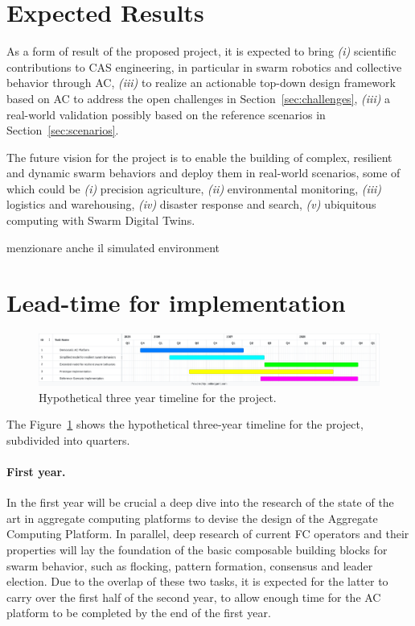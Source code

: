 \documentclass[12pt]{article}
\begin{document}
\section{Expected Results}
As a form of result of the proposed project, it is expected to bring \textit{(i)} scientific contributions to CAS engineering, in particular in swarm robotics and collective behavior through AC,
\textit{(iii)} to realize an actionable top-down design framework based on AC to address the open challenges in Section~\ref{sec:challenges}, \textit{(iii)} a real-world validation possibly based on the reference scenarios in Section~\ref{sec:scenarios}.

The future vision for the project is to enable the building of complex, resilient and dynamic swarm behaviors and deploy them in real-world scenarios, some of which could be \textit{(i)} precision agriculture,
\textit{(ii)} environmental monitoring, \textit{(iii)} logistics and warehousing, \textit{(iv)} disaster response and search, 
\textit{(v)} ubiquitous computing with Swarm Digital Twins.

menzionare anche il simulated environment
\section{Lead-time for implementation}
\begin{figure}
	\includegraphics[width=\linewidth]{figures/timeline.png}
	\caption{Hypothetical three year timeline for the project.}
	\label{fig:timeline}
\end{figure}

The Figure~\ref{fig:timeline} shows the hypothetical three-year timeline for the project, subdivided into quarters.

\paragraph{First year.} In the first year will be crucial a deep dive into the research of the state of the art in aggregate computing platforms to devise the design of the Aggregate Computing Platform.
In parallel, deep research of current FC operators and their properties will lay the foundation of the basic composable building blocks for swarm behavior, such as flocking, pattern formation, consensus and leader election.
Due to the overlap of these two tasks, it is expected for the latter to carry over the first half of the second year, to allow enough time for the AC platform to be completed by the end of the first year.
\end{document}
